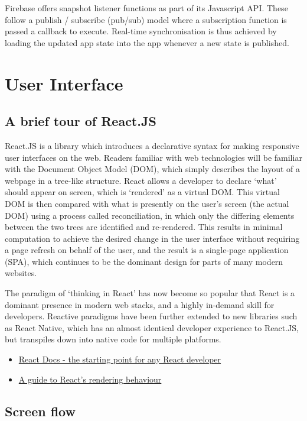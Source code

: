 Firebase offers snapshot listener functions as part of its Javascript API. These follow a publish / subscribe (pub/sub) model where a subscription function is passed a callback to execute. Real-time synchronisation is thus achieved by loading the updated app state into the app whenever a new state is published.

\section{User Interface}

\subsection{A brief tour of React.JS}
React.JS is a library which introduces a declarative syntax for making responsive user interfaces on the web. Readers familiar with web technologies will be familiar with the Document Object Model (DOM), which simply describes the layout of a webpage in a tree-like structure. React allows a developer to declare `what' should appear on screen, which is `rendered' as a virtual DOM. This virtual DOM is then compared with what is presently on the user's screen (the actual DOM) using a process called reconciliation, in which only the differing elements between the two trees are identified and re-rendered. This results in minimal computation to achieve the desired change in the user interface without requiring a page refresh on behalf of the user, and the result is a single-page application (SPA), which continues to be the dominant design for parts of many modern websites.

The paradigm of `thinking in React' has now become so popular that React is a dominant presence in modern web stacks, and a highly in-demand skill for developers. Reactive paradigms have been further extended to new libraries such as React Native, which has an almost identical developer experience to React.JS, but transpiles down into native code for multiple platforms.

\begin{itemize}
    \item \href{https://reactjs.org/docs/hello-world.html}{React Docs - the starting point for any React developer}
    \item \href{https://blog.isquaredsoftware.com/2020/05/blogged-answers-a-mostly-complete-guide-to-react-rendering-behavior/#rendering-process-overview}{A guide to React's rendering behaviour}
\end{itemize}

\subsection{Screen flow}